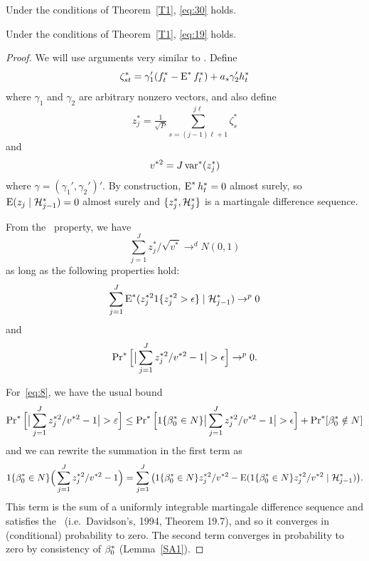 \documentclass[12pt,fleqn]{article}
\begin{document}
\begin{lema}\label{SA5}
  Under the conditions of Theorem~\ref{T1}, \eqref{eq:30} holds.
\end{lema}

\begin{lema}\label{SA6}
  Under the conditions of Theorem~\ref{T1}, \eqref{eq:19} holds.
\end{lema}
\begin{proof}

  We will use arguments very similar to \cite{Cal:14}. Define
  \[
  \zeta_{st}^* = \gamma_1'(f_t^* - \operatorname{E}^* f_t^*) + a_s \gamma_2' h_t^*
  \]
  where $\gamma_1$ and $\gamma_2$ are arbitrary nonzero vectors, and
  also define
  \[
  z_j^* = \tfrac{1}{\sqrt{P}} \sum_{s=(j-1) \ell + 1}^{j\ell} \zeta_s^*
  \]
  and
  \[
  v^{*2} = J \operatorname{var}^*(z_j^*)
  \]
  where $\gamma = (\gamma_1', \gamma_2')'$. By construction, $\operatorname{E}^*
  h_t^* = 0$ almost surely, so $\operatorname{E}(z_j \mid \mathcal{H}_{j-1}^*) = 0$ almost
  surely and $\{z_j^*, \mathcal{H}_j^*\}$ is a martingale difference sequence.

  From the \mds\ property, we have
  \begin{equation*}
    \sum_{j=1}^J z_j^* / \sqrt{v^*} \to^d N(0, 1)
  \end{equation*}
  as long as the following properties hold:
  \begin{equation}\label{eq:7}
    \sum_{j=1}^J \operatorname{E}^*(z_j^{*2} 1\{z_j^{*2} > \epsilon\} \mid \mathcal{H}_{j-1}^*) \to^p 0
  \end{equation}
  and
  \begin{equation}\label{eq:8}
    \operatorname{Pr}^*\Big[ \big| \sum_{j=1}^J z_j^{*2}/v^{*2} - 1 \big| > \epsilon\Big] \to^p 0.
  \end{equation}

  For~\eqref{eq:8}, we have the usual bound
  \begin{equation*}
    \operatorname{Pr}^*\Big[ \big|\sum_{j=1}^J z_j^{*2}/v^{*2} - 1 \big| > \varepsilon\Big] \leq
    \operatorname{Pr}^*\Big[ 1\{\beta_0^* \in N\} \big| \sum_{j=1}^J z_j^{*2}/v^{*2} - 1 \big| > \epsilon \Big]
     + \operatorname{Pr}^*[ \beta_0^* \notin N ]
  \end{equation*}
  and we can rewrite the summation in the first term as
  \begin{equation*}
    1\{\beta_0^* \in N\} \Big( \sum_{j=1}^J z_j^{*2}/v^{*2} - 1 \Big)
    =  \sum_{j=1}^J \big(1\{\beta_0^* \in N\}z_j^{*2}/v^{*2} -
    \operatorname{E}(1\{\beta_0^* \in N\}z_j^{*2}/v^{*2} \mid \mathcal{H}_{j-1}^*) \big).
   \end{equation*}
   This term is the sum of a uniformly integrable martingale
   difference sequence and satisfies the \lln\ (i.e.\ Davidson's, 1994,
   Theorem 19.7), and so it converges in (conditional) probability to
   zero.  The second term converges in probability to zero by
   consistency of $\beta_0^*$ (Lemma~\ref{SA1}).


\end{proof}
\end{document}
